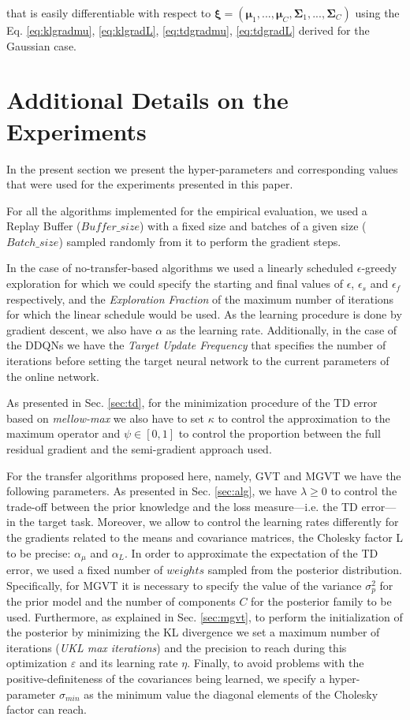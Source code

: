 \documentclass{article}
\begin{document}
that is easily differentiable with respect to $\bm{\xi} = (\bm{\mu}_1,..., \bm{\mu}_C, \bm{\Sigma}_1,..., \bm{\Sigma}_C)$ using the Eq. \ref{eq:klgradmu}, \ref{eq:klgradL}, \ref{eq:tdgradmu}, \ref{eq:tdgradL} derived for the Gaussian case.

\section{Additional Details on the Experiments}

In the present section we present the hyper-parameters and corresponding values that were used for the experiments presented in this paper. 

For all the algorithms implemented for the empirical evaluation, we used a Replay Buffer ($Buffer\_size$) with a fixed size and batches of a given size ($Batch\_size$) sampled randomly from it to perform the gradient steps. 

In the case of no-transfer-based algorithms we used a linearly scheduled $\epsilon$-greedy exploration for which we could specify the starting and final values of $\epsilon$, $\epsilon_s$ and $\epsilon_f$ respectively, and the \emph{Exploration Fraction} of the maximum number of iterations for which the linear schedule would be used. As the learning procedure is done by gradient descent, we also have $\alpha$ as the learning rate. Additionally, in the case of the DDQNs we have the \emph{Target Update Frequency} that specifies the number of iterations before setting the target neural network to the current parameters of the online network. 

As presented in Sec. \ref{sec:td}, for the minimization procedure of the TD error based on \emph{mellow-max} we also have to set $\kappa$ to control the approximation to the maximum operator and $\psi \in \left[0,1\right]$ to control the proportion between the full residual gradient and the semi-gradient approach used. 

For the transfer algorithms proposed here, namely, GVT and MGVT we have the following parameters. As presented in Sec. \ref{sec:alg}, we have $\lambda \geq 0$ to control the trade-off between the prior knowledge and the loss measure---i.e. the TD error---in the target task. Moreover, we allow to control the learning rates differently for the gradients related to the means and covariance matrices, the Cholesky factor L to be precise: $\alpha_{\mu}$ and $\alpha_L$. In order to approximate the expectation of the TD error, we used a fixed number of $weights$ sampled from the posterior distribution. Specifically, for MGVT it is necessary to specify the value of the variance $\sigma_p^2$ for the prior model and the number of components $C$ for the posterior family to be used. Furthermore, as explained in Sec. \ref{sec:mgvt}, to perform the initialization of the posterior by minimizing the KL divergence we set a maximum number of iterations (\emph{UKL max iterations}) and the precision to reach during this optimization $\varepsilon$ and its learning rate $\eta$. Finally, to avoid problems with the positive-definiteness of the covariances being learned, we specify a hyper-parameter $\sigma_{min}$ as the minimum value the diagonal elements of the Cholesky factor can reach.
\end{document}
